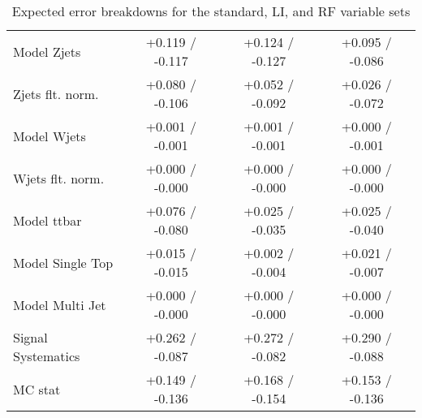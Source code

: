 \begin{table}[!htbp]
\begin{center}
\begin{tabular}{lccc}
Model Zjets &  +0.119 / -0.117  &  +0.124 / -0.127  &  +0.095 / -0.086 \\
Zjets flt. norm. &  +0.080 / -0.106  &  +0.052 / -0.092  &  +0.026 / -0.072 \\
Model Wjets &  +0.001 / -0.001  &  +0.001 / -0.001  &  +0.000 / -0.001 \\
Wjets flt. norm. &  +0.000 / -0.000  &  +0.000 / -0.000  &  +0.000 / -0.000 \\
Model ttbar &  +0.076 / -0.080  &  +0.025 / -0.035  &  +0.025 / -0.040 \\
Model Single Top &  +0.015 / -0.015  &  +0.002 / -0.004  &  +0.021 / -0.007 \\
Model Multi Jet &  +0.000 / -0.000  &  +0.000 / -0.000  &  +0.000 / -0.000 \\
Signal Systematics &  +0.262 / -0.087  &  +0.272 / -0.082  &  +0.290 / -0.088 \\
MC stat &  +0.149 / -0.136  &  +0.168 / -0.154  &  +0.153 / -0.136 \\
\hline\hline
\end{tabular}
\end{center}
\caption{Expected error breakdowns for the standard, LI, and RF variable sets}
\label{tab:breakdownexp}
\end{table}

